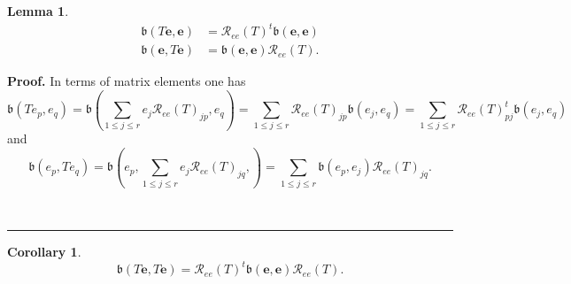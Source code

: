 \documentclass[aps,preprint]{revtex4}%
\newtheorem{corollary}[theorem]{Corollary}
\newtheorem{lemma}[theorem]{Lemma}
\newenvironment{proof}[1][Proof]{\noindent\textbf{#1.} }{\ \rule{0.5em}{0.5em}}
\begin{document}
\begin{lemma}%
\begin{align}
\mathfrak{b}\left(  T\boldsymbol{e},\boldsymbol{e}\right)   &  =\mathcal{R}%
_{ee}\left(  T\right)  ^{t}\mathfrak{b}\left(  \boldsymbol{e},\boldsymbol{e}%
\right) \\
\mathfrak{b}\left(  \boldsymbol{e},T\boldsymbol{e}\right)   &  =\mathfrak{b}%
\left(  \boldsymbol{e},\boldsymbol{e}\right)  \mathcal{R}_{ee}\left(
T\right)  .
\end{align}

\end{lemma}

\begin{proof}
In terms of matrix elements one has
\begin{equation}
\mathfrak{b}\left(  Te_{p},e_{q}\right)  =\mathfrak{b}\left(  \sum_{1\leq
j\leq r}e_{j}\mathcal{R}_{ee}\left(  T\right)  _{jp},e_{q}\right)
=\sum_{1\leq j\leq r}\mathcal{R}_{ee}\left(  T\right)  _{jp}\mathfrak{b}%
\left(  e_{j},e_{q}\right)  =\sum_{1\leq j\leq r}\mathcal{R}_{ee}\left(
T\right)  _{pj}^{t}\mathfrak{b}\left(  e_{j},e_{q}\right)
\end{equation}
and
\begin{equation}
\mathfrak{b}\left(  e_{p},Te_{q}\right)  =\mathfrak{b}\left(  e_{p}%
,\sum_{1\leq j\leq r}e_{j}\mathcal{R}_{ee}\left(  T\right)  _{jq},\right)
=\sum_{1\leq j\leq r}\mathfrak{b}\left(  e_{p},e_{j}\right)  \mathcal{R}%
_{ee}\left(  T\right)  _{jq}.
\end{equation}

\end{proof}

\begin{corollary}%
\begin{equation}
\mathfrak{b}\left(  T\boldsymbol{e},T\boldsymbol{e}\right)  =\mathcal{R}%
_{ee}\left(  T\right)  ^{t}\mathfrak{b}\left(  \boldsymbol{e},\boldsymbol{e}%
\right)  \mathcal{R}_{ee}\left(  T\right)  .
\end{equation}

\end{corollary}
\end{document}
